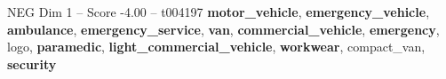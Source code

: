 \begin{textsample}{NEG Dim 1 – Score -4.00 – t004197}  \label{ex:f1_neg_019}
\textbf{motor\_vehicle}, \textbf{emergency\_vehicle}, \textbf{ambulance}, \textbf{emergency\_service}, \textbf{van}, \textbf{commercial\_vehicle}, \textbf{emergency}, logo, \textbf{paramedic}, \textbf{light\_commercial\_vehicle}, \textbf{workwear}, compact\_van, \textbf{security}

\end{textsample}

